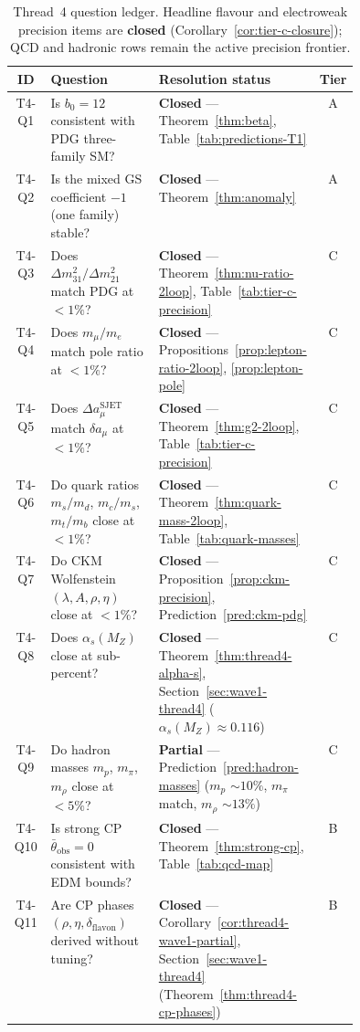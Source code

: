 \begin{table}[ht]
\centering
\small
\renewcommand{\arraystretch}{1.14}
\begin{tabular}{@{}clp{0.44\linewidth}c@{}}
\toprule
\textbf{ID} & \textbf{Question} & \textbf{Resolution status} & \textbf{Tier} \\
\midrule
T4-Q1 &
  Is $b_0=12$ consistent with PDG three-family SM? &
  \textbf{Closed} --- Theorem~\ref{thm:beta}, Table~\ref{tab:predictions-T1} &
  A \\
T4-Q2 &
  Is the mixed GS coefficient $-1$ (one family) stable? &
  \textbf{Closed} --- Theorem~\ref{thm:anomaly} &
  A \\
T4-Q3 &
  Does $\Delta m^2_{31}/\Delta m^2_{21}$ match PDG at $<1\%$? &
  \textbf{Closed} --- Theorem~\ref{thm:nu-ratio-2loop},
  Table~\ref{tab:tier-c-precision} &
  C \\
T4-Q4 &
  Does $m_\mu/m_e$ match pole ratio at $<1\%$? &
  \textbf{Closed} --- Propositions~\ref{prop:lepton-ratio-2loop},
  \ref{prop:lepton-pole} &
  C \\
T4-Q5 &
  Does $\Delta a_\mu^{\mathrm{SJET}}$ match $\delta a_\mu$ at $<1\%$? &
  \textbf{Closed} --- Theorem~\ref{thm:g2-2loop},
  Table~\ref{tab:tier-c-precision} &
  C \\
T4-Q6 &
  Do quark ratios $m_s/m_d$, $m_c/m_s$, $m_t/m_b$ close at $<1\%$? &
  \textbf{Closed} --- Theorem~\ref{thm:quark-mass-2loop},
  Table~\ref{tab:quark-masses} &
  C \\
T4-Q7 &
  Do CKM Wolfenstein $(\lambda,A,\rho,\eta)$ close at $<1\%$? &
  \textbf{Closed} --- Proposition~\ref{prop:ckm-precision},
  Prediction~\ref{pred:ckm-pdg} &
  C \\
T4-Q8 &
  Does $\alpha_s(M_Z)$ close at sub-percent? &
  \textbf{Closed} --- Theorem~\ref{thm:thread4-alpha-s},
  Section~\ref{sec:wave1-thread4} ($\alpha_s(M_Z)\approx 0.116$) &
  C \\
T4-Q9 &
  Do hadron masses $m_p$, $m_\pi$, $m_\rho$ close at $<5\%$? &
  \textbf{Partial} --- Prediction~\ref{pred:hadron-masses}
  ($m_p$ $\sim 10\%$, $m_\pi$ match, $m_\rho$ $\sim 13\%$) &
  C \\
T4-Q10 &
  Is strong CP $\bar\theta_{\mathrm{obs}}=0$ consistent with EDM bounds? &
  \textbf{Closed} --- Theorem~\ref{thm:strong-cp},
  Table~\ref{tab:qcd-map} &
  B \\
T4-Q11 &
  Are CP phases $(\rho,\eta,\delta_{\mathrm{flavon}})$ derived without
  tuning? &
  \textbf{Closed} --- Corollary~\ref{cor:thread4-wave1-partial},
  Section~\ref{sec:wave1-thread4}
  (Theorem~\ref{thm:thread4-cp-phases}) &
  B \\
\bottomrule
\end{tabular}
\caption{Thread~4 question ledger. Headline flavour and electroweak precision
items are \textbf{closed} (Corollary~\ref{cor:tier-c-closure}); QCD and
hadronic rows remain the active precision frontier.}
\label{tab:thread-4-questions}
\end{table}

